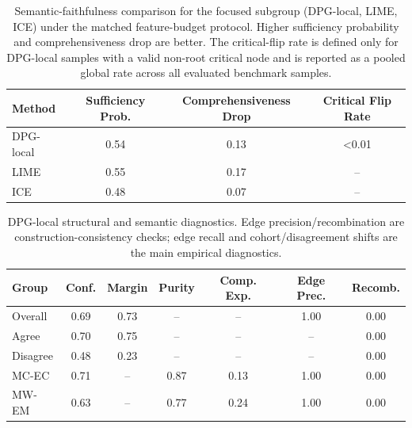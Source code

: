 \documentclass[runningheads]{llncs}
\begin{document}
\begin{table}[ht!]
  \centering
  \small
  \caption{Semantic-faithfulness comparison for the focused subgroup
    (DPG-local, LIME, ICE) under the matched feature-budget protocol. Higher
    sufficiency probability and comprehensiveness drop are better.
    The critical-flip rate is defined only for DPG-local samples with a valid
    non-root
    critical node and is reported as a pooled global rate across all evaluated
    benchmark samples.}
  \label{tab:semantic-faithfulness}
  \begin{tabular}{lccc}
    \toprule
    Method                    & Sufficiency Prob. & Comprehensiveness Drop &
    Critical Flip Rate
    \\
    \midrule
    DPG-local & 0.54             & 0.13                  &
    <0.01
    \\
    LIME                      & 0.55             & 0.17                  & --
    \\
    ICE                       & 0.48             & 0.07                  & --
    \\
    \bottomrule
  \end{tabular}
\end{table}

\begin{table}[ht!]
\centering
\small
\caption{DPG-local structural and semantic diagnostics. Edge precision/recombination are construction-consistency checks; edge recall and cohort/disagreement shifts are the main empirical diagnostics.}
\label{tab:dpg-structural}
\begin{tabular}{lcccccc}
\toprule
Group & Conf. & Margin & Purity & Comp. Exp. & Edge Prec. & Recomb. \\
\midrule
Overall  & 0.69 & 0.73 & --   & --   & 1.00 & 0.00 \\
Agree    & 0.70 & 0.75 & --   & --   & --   & 0.00 \\
Disagree & 0.48 & 0.23 & --   & --   & --   & 0.00 \\
MC-EC    & 0.71 & --   & 0.87 & 0.13 & 1.00 & 0.00 \\
MW-EM    & 0.63 & --   & 0.77 & 0.24 & 1.00 & 0.00 \\
\bottomrule
\end{tabular}
\end{table}
\end{document}
